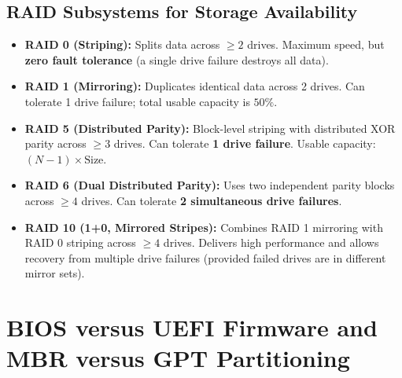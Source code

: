\subsection{RAID Subsystems for Storage Availability}
\begin{itemize}
    \item \textbf{RAID 0 (Striping):} Splits data across $\ge 2$ drives. Maximum speed, but \textbf{zero fault tolerance} (a single drive failure destroys all data).
    \item \textbf{RAID 1 (Mirroring):} Duplicates identical data across 2 drives. Can tolerate 1 drive failure; total usable capacity is $50\%$.
    \item \textbf{RAID 5 (Distributed Parity):} Block-level striping with distributed XOR parity across $\ge 3$ drives. Can tolerate \textbf{1 drive failure}. Usable capacity: $(N - 1) \times \text{Size}$.
    \item \textbf{RAID 6 (Dual Distributed Parity):} Uses two independent parity blocks across $\ge 4$ drives. Can tolerate \textbf{2 simultaneous drive failures}.
    \item \textbf{RAID 10 (1+0, Mirrored Stripes):} Combines RAID 1 mirroring with RAID 0 striping across $\ge 4$ drives. Delivers high performance and allows recovery from multiple drive failures (provided failed drives are in different mirror sets).
\end{itemize}


\section{BIOS versus UEFI Firmware and MBR versus GPT Partitioning}
\label{sec:firmware_partitioning}

